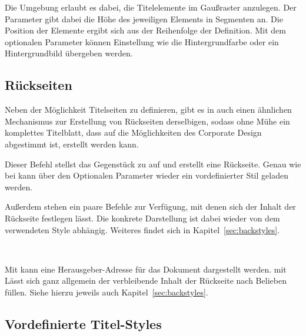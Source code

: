 Die Umgebung  erlaubt es dabei, die Titelelemente im 
Gaußraster anzulegen. Der Parameter  gibt dabei
die Höhe des jeweiligen Elements in Segmenten an. Die Position der Elemente
ergibt sich aus der Reihenfolge der Definition.
Mit dem optionalen Parameter  können Einstellung wie die Hintergrundfarbe oder ein Hintergrundbild übergeben werden.

\subsection{Rückseiten}

Neben der Möglichkeit Titelseiten zu definieren, gibt es in \tubslatex auch
einen ähnlichen Mechanismus zur Erstellung von Rückseiten derselbigen, sodass
ohne Mühe ein komplettes Titelblatt, dass auf die Möglichkeiten des
Corporate Design abgestimmt ist, erstellt werden kann.

\begin{Declaration}
\end{Declaration}

Dieser Befehl stellst das Gegenstück zu  auf und erstellt eine
Rückseite. Genau wie bei  kann über den Optionalen Parameter
 wieder ein vordefinierter Stil geladen werden.

Außerdem stehen ein paare Befehle zur Verfügung, mit denen sich der Inhalt
der Rückseite festlegen lässt. Die konkrete Darstellung ist dabei wieder
von dem verwendeten Style abhängig. Weiteres findet sich in 
Kapitel~\ref{sec:backstyles}.


\begin{Declaration}
  \\
\end{Declaration}

Mit  kann eine Herausgeber-Adresse für das Dokument
dargestellt werden.
mit  Lässt sich ganz allgemein der verbleibende
Inhalt der Rückseite nach Belieben füllen.
Siehe hierzu jeweils auch Kapitel~\ref{sec:backstyles}.

\subsection{Vordefinierte Titel-Styles}\label{sec:titlestyles}


